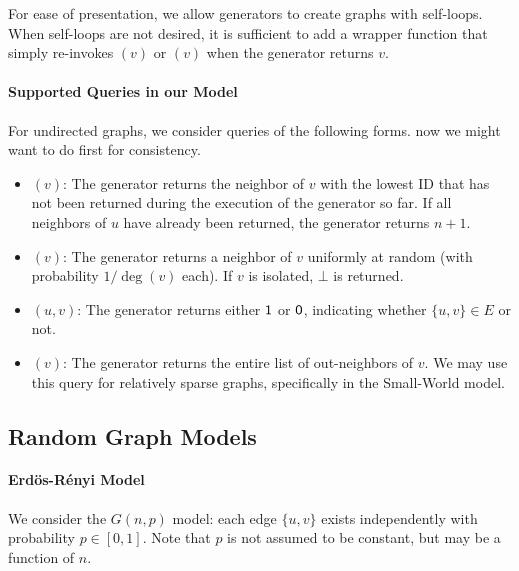 For ease of presentation, we allow generators to create graphs with self-loops.
When self-loops are not desired, it is sufficient to add a wrapper function that simply re-invokes $(v)$ or $(v)$ when the generator returns $v$.


\paragraph*{Supported Queries in our Model} 
For undirected graphs, we consider queries of the following forms.
now we might want to do  first for consistency.
\begin{itemize}
\item {}$(v)$: The generator returns the neighbor of $v$ with the lowest ID that has not been returned during the execution of the generator so far. If all neighbors of $u$ have already been returned, the generator returns $n+1$.
\item {}$(v)$: The generator returns a neighbor of $v$ uniformly at random (with probability $1/\deg(v)$ each). If $v$ is isolated, $\bot$ is returned.
\item {}$(u,v)$: The generator returns either $\mathsf{1}$ or $\mathsf{0}$, indicating whether $\{u,v\}\in E$ or not.
\item {}$(v)$: The generator returns the entire list of out-neighbors of $v$. We may use this query for relatively sparse graphs, specifically in the Small-World model.
\end{itemize}

\subsection{Random Graph Models}
\label{sec:graph_model}

\paragraph*{Erd\"{o}s-R\'{e}nyi Model}
We consider the $G(n, p)$ model: each edge $\{u,v\}$ exists independently with probability $p \in [0, 1]$.
Note that $p$ is not assumed to be constant, but may be a function of $n$.

